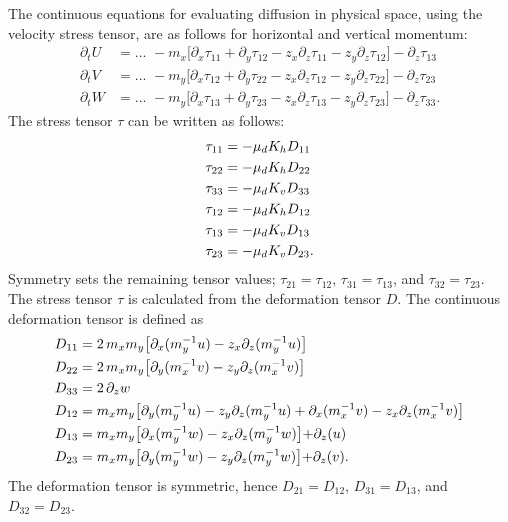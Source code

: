 The continuous equations for evaluating diffusion in physical space,
using the velocity stress tensor, are as follows for
horizontal and vertical momentum:
%
\begin{align}
\partial_t U &= ...\,\,
- m_x \bigl[ \partial_x \tau_{11} + \partial_y \tau_{12} 
- z_x \partial_z  \tau_{11} - z_y \partial_z \tau_{12} \bigr]
- \partial_z \tau_{13}
\label{u-disp-phys} \\
%
\partial_t V &= ...\,\,
- m_y \bigl[ \partial_x \tau_{12} + \partial_y \tau_{22} 
- z_x \partial_z \tau_{12} - z_y \partial_z \tau_{22} \bigr]
- \partial_z \tau_{23}
\label{v-disp-phys} \\
%
\partial_t W &= ...\,\,
- m_y \bigl[ \partial_x \tau_{13} + \partial_y \tau_{23} 
- z_x \partial_z \tau_{13} - z_y \partial_z \tau_{23} \bigr]
- \partial_z \tau_{33}.
\label{w-disp-phys}
\end{align}
%
The stress tensor $\tau$ can be written as follows:
%
\begin{align}
\tau_{11} &= -\mu_d K_h D_{11} 
\notag \\
%
\tau_{22} &= -\mu_d K_h D_{22} 
\notag \\
%
\tau_{33} &= -\mu_d K_v D_{33} 
\notag \\
%
\tau_{12} &= -\mu_d K_h D_{12} 
\notag \\
%
\tau_{13} &= -\mu_d K_v D_{13} 
\notag \\
%
\tau_{23} &= -\mu_d K_v D_{23}.
\notag 
%
\end{align}
%
\noindent
Symmetry sets the remaining tensor values;
$\tau_{21} = \tau_{12}$, $\tau_{31} = \tau_{13}$, and $\tau_{32} = \tau_{23}$.
The stress tensor $\tau$ is calculated from the deformation tensor
$D$.  The continuous deformation tensor is defined as
%
\begin{align}
D_{11} &= 2 \, m_x m_y \bigl[ \partial_x (m_y^{-1}u) - z_x \partial_z
(m_y^{-1}u) \bigl] 
\notag \\
%
D_{22} &= 2 \, m_x m_y \bigl[ \partial_y (m_x^{-1}v) - z_y \partial_z
(m_x^{-1}v) \bigl] 
\notag \\
%
D_{33} &= 2 \, \partial_z w
\notag \\
%
D_{12} &= m_x m_y \bigl[ 
\partial_y (m_y^{-1}u) - z_y \partial_z(m_y^{-1}u)
+ \partial_x (m_x^{-1}v) - z_x \partial_z (m_x^{-1}v)
\bigl] 
\notag \\
%
D_{13} &= m_x m_y \bigl[ 
\partial_x (m_y^{-1}w) - z_x \partial_z(m_y^{-1}w)
\bigl] 
+ \partial_z (u)
\notag \\
%
D_{23} &= m_x m_y \bigl[ 
\partial_y (m_y^{-1}w) - z_y \partial_z(m_y^{-1}w)
\bigl] 
+ \partial_z (v).
\notag 
%
\end{align}
%
\noindent
The deformation tensor is symmetric, hence 
$D_{21} = D_{12}$, $D_{31} = D_{13}$, and $D_{32} = D_{23}$.

